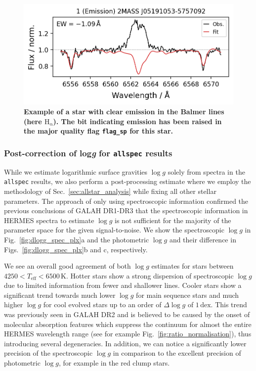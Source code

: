 \documentclass[
  journal=pasa,
  manuscript=research-paper, %
  year=2024,
  volume=37
]{cup-journal}
\newcommand{\logg}{$\log g$\xspace}
\begin{document}
\begin{figure}[ht]
 \centering
 \includegraphics[width=\textwidth]{figures/examples_flag_sp_1.png}
 \caption{\textbf{Example of a star with clear emission in the Balmer lines (here $\mathrm{H_\upalpha}$). The bit indicating emission has been raised in the major quality flag \texttt{flag\_sp} for this star.}} \label{fig:examples_flag_sp_1}
\end{figure}

\subsubsection{Post-correction of {log\textit{g}} for \texttt{allspec} results}

While we estimate logarithmic surface gravities \logg solely from spectra in the \texttt{allspec} results, we also perform a post-processing estimate where we employ the methodology of Sec.~\ref{sec:allstar_analysis} while fixing all other stellar parameters. The approach of only using spectroscopic information confirmed the previous conclusions of GALAH DR1-DR3 that the spectroscopic information in HERMES spectra to estimate \logg is not sufficient for the majority of the parameter space for the given signal-to-noise. We show the spectroscopic \logg in Fig.~\ref{fig:dlogg_spec_plx}a and the photometric \logg and their difference in Figs.~\ref{fig:dlogg_spec_plx}b and c, respectively.

We see an overall good agreement of both \logg estimates for stars between $4250 < T_\text{eff} < 6500\,\mathrm{K}$. Hotter stars show a strong dispersion of spectroscopic \logg due to limited information from fewer and shallower lines. Cooler stars show a significant trend towards much lower \logg for main sequence stars and much higher \logg for cool evolved stars up to an order of $\Delta \log g$ of $1\,\mathrm{dex}$. This trend was previously seen in GALAH DR2 \citep{Buder2018} and is believed to be caused by the onset of molecular absorption features which suppress the continuum for almost the entire HERMES wavelength range (see for example Fig.~\ref{fig:ratio_normalisation}), thus introducing several degeneracies. In addition, we can notice a significantly lower precision of the spectroscopic \logg in comparison to the excellent precision of photometric \logg, for example in the red clump stars.
\end{document}
